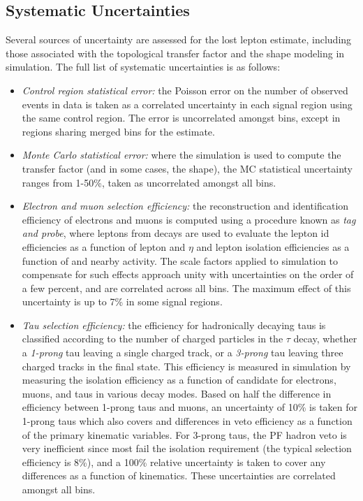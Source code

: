 \subsection{Systematic Uncertainties}
\label{subsec:lostlepSyst}

Several sources of uncertainty are assessed for the lost lepton estimate, including those associated with the topological transfer factor and the \mttwo shape modeling in simulation. The full list of systematic uncertainties is as follows:
\begin{itemize}
	\item {\it Control region statistical error:} the Poisson error on the number of observed events in data is taken as a correlated uncertainty in each signal region using the same control region. The error is uncorrelated amongst \mttwo bins, except in regions sharing merged \mttwo bins for the estimate.
	\item {\it Monte Carlo statistical error:} where the simulation is used to compute the transfer factor (and in some cases, the \mttwo shape), the MC statistical uncertainty ranges from 1-50\%, taken as uncorrelated amongst all bins.
	\item {\it Electron and muon selection efficiency:} the reconstruction and identification efficiency of electrons and muons is computed using a procedure known as {\it tag and probe}, where leptons from \Zll decays are used to evaluate the lepton id efficiencies as a function of lepton \pt and $\eta$ and lepton isolation efficiencies as a function of \pt and nearby activity. The scale factors applied to simulation to compensate for such effects approach unity with uncertainties on the order of a few percent, and are correlated across all bins. The maximum effect of this uncertainty is up to 7\% in some signal regions.
	\item {\it Tau selection efficiency:} the efficiency for hadronically decaying taus is classified according to the number of charged particles in the $\tau$ decay, whether a {\it 1-prong} tau leaving a single charged track, or a {\it 3-prong} tau leaving three charged tracks in the final state. This efficiency is measured in simulation by measuring the isolation efficiency as a function of candidate \pt for electrons, muons, and taus in various decay modes. Based on half the difference in efficiency between 1-prong taus and muons, an uncertainty of 10\% is taken for 1-prong taus which also covers and differences in veto efficiency as a function of the primary kinematic variables. For 3-prong taus, the PF hadron veto is very inefficient since most fail the isolation requirement (the typical selection efficiency is 8\%), and a 100\% relative uncertainty is taken to cover any differences as a function of kinematics. These uncertainties are correlated amongst all bins.

\end{itemize}
